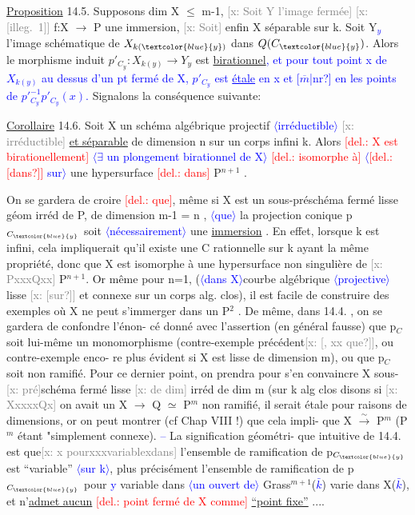 \documentclass[11pt]{article}
\newcommand{\hand}[1]{\textcolor{blue}{#1}}
\newcommand{\inserted}[2][]{\textcolor{blue}{$\langle$#2$\rangle$}}
\newcommand{\deleted}[1]{\textcolor{red}{[\textsf{del.:} #1]}}
\newcommand{\xout}[1]{\textcolor{gray}{[\textsf{x:} #1]}}
\newcommand{\uline}[1]{\underline{#1}}
\newcommand{\unsure}[1]{[#1?]}
\newcommand{\illegible}[1]{[\textsf{illeg.\ #1}]}
\begin{document}
\uline{Proposition} 14.5. Supposons dim X $\leqslant$ m-1, \xout{Soit Y l'image fermée}
\xout{\illegible{1}} f:X $\to$ P une immersion, \xout{Soit} enfin X séparable sur k. Soit Y\hand{$_y$} l'image
schématique de $X_{k(\hand{y})}$ dans $Q(C_{\hand{y}})$. Alors le morphisme induit
$p'_{C_y} : X_{k(y)} \to Y_y$ est \uline{birationnel}\hand{, et pour tout point x de $X_{k(y)}$ au dessus}
\hand{d'un pt fermé de X, $p'_{C_y}$ est \uline{étale} en x et \unsure{$\overline{m}$|nr} en les points de $p'^{-1}_{C_y}p'_{C_y}(x)$.}
Signalons la conséquence suivante:

\uline{Corollaire} 14.6. Soit X un schéma algébrique projectif \inserted[typed]{irréductible} \xout{irréductible}
\uline{et séparable}
de dimension n sur un corps infini k. Alors \deleted{X est birationellement} \inserted{$\exists$ un plongement birationnel de X}
\deleted{isomorphe à} \inserted{\deleted{\unsure{dans}} sur} une hypersurface \deleted{dans} P$^{n+1}$ .

On se gardera de croire \deleted{que}, même si X est un sous-préschéma fermé
lisse géom irréd de P, de dimension m-1 = n , \inserted[typed]{que} la projection conique p$_{C_{\hand{y}}}$
soit \inserted[typed]{nécessairement} une \uline{immersion} . En effet, lorsque k est infini, cela impliquerait
qu'il existe une C rationnelle sur k ayant la même propriété, donc que X
est isomorphe à une hypersurface non singulière de \xout{PxxxQxx} P$^{n+1}$. Or
même pour n=1, (\inserted{dans X}courbe algébrique \inserted[typed]{projective} lisse \xout{\unsure{sur}} et connexe sur un corps alg.
clos), il est facile de construire des exemples où X ne peut s'immerger
dans un P$^2$ . De même, dans 14.4. , on se gardera de confondre l'énon-%
cé donné avec l'assertion (en général fausse) que p$_C$ soit lui-même un
monomorphisme (contre-exemple précédent\xout{\unsure{, xx que}}, ou contre-exemple enco-%
re plus évident si X est lisse de dimension m), ou que p$_C$ soit non
ramifié. Pour ce dernier point, on prendra pour s'en convaincre X
sous-\xout{pré}schéma fermé lisse \xout{de dim} irréd de dim m (sur k alg clos disons
si \xout{XxxxxQx} on avait un X $\to$ Q $\simeq$ P$^m$ non ramifié, il serait étale pour
raisons de dimensions, or on peut montrer (cf Chap VIII !) que cela impli-%
que X $\xrightarrow{\sim}$ P$^m$ (P$^m$ étant "simplement connexe). \hand{--} La signification géométri-%
que intuitive de 14.4. est que\xout{x pourxxxvariablexdans} l'ensemble de
ramification de p$_{C_{\hand{y}}}$ est ``variable'' \inserted{sur k}, plus précisément l'ensemble de
ramification de p$_{C_{\hand{y}}}$ pour \hand{y} variable dans \inserted{un ouvert de} Grass$^{m+1}$(\hand{$\bar{k}$}) varie dans X(\hand{$\bar{k}$}), et
n'\uline{admet aucun} \deleted{point fermé de X comme} \uline{``point fixe''} ....
\end{document}

